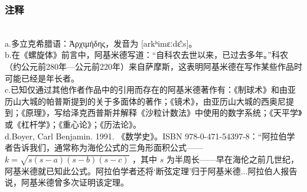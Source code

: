 \subsubsection{注释}\\  
a.多立克希腊语：Ἀρχιμήδης，发音为 [arkʰimɛːdɛ̂ːs]。\\  
b.在《螺旋体》前言中，阿基米德写道：“自科农去世以来，已过去多年。”科农（约公元前280年—公元前220年）来自萨摩斯，这表明阿基米德在写作某些作品时可能已经是年长者。\\  
c.已知仅通过其他作者作品中的引用而存在的阿基米德著作有：《制球术》和由亚历山大城的帕普斯提到的关于多面体的著作；《镜术》，由亚历山大城的西奥尼提到；《原理》，写给泽克西普斯并解释《沙粒计数法》中使用的数字系统；《天平学》或《杠杆学》；《重心论》；《历法论》。\\  
d.Boyer, Carl Benjamin. 1991. 《数学史》。ISBN 978-0-471-54397-8：“阿拉伯学者告诉我们，通常称为海伦公式的三角形面积公式—— \( k = \sqrt{s(s-a)(s-b)(s-c)} \) ，其中 \( s \) 为半周长——早在海伦之前几世纪，阿基米德就已知此公式。阿拉伯学者还将‘断弦定理’归于阿基米德...阿拉伯人报告说，阿基米德曾多次证明该定理。

